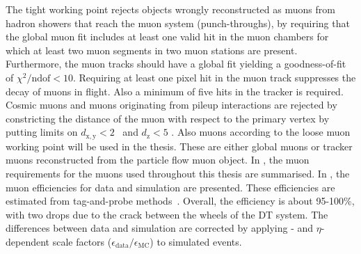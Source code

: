The tight working point rejects objects wrongly reconstructed as muons from hadron showers that reach the muon system (punch-throughs), by requiring that the global muon fit includes at least one valid hit in the muon chambers for which at least two muon segments in two muon stations are present. Furthermore, the muon tracks should have a global fit yielding a goodness-of-fit of $\chi^2 / \mathrm{ndof} < 10$. Requiring at least one pixel hit in the muon track suppresses the decay of muons in flight. Also a minimum of five hits in the tracker is required. Cosmic muons and muons originating from pileup interactions are rejected by constricting the distance of the muon with respect to the primary vertex by putting limits on $d_{\mathrm{x,y}}< 2$ \mm\ and $d_{\mathrm{z}}<5$ \mm. Also muons according to the loose muon working point will be used in the thesis. These are either global muons or tracker muons reconstructed from the particle flow muon object. In , the muon requirements for the muons used throughout this thesis are summarised.  In , the muon efficiencies for data and simulation are presented. These efficiencies are estimated from tag-and-probe methods~\cite{CMS-DP-2017-007}.
Overall, the efficiency is about 95-100\%, with two drops due to the crack between the wheels of the DT system. The differences between data and simulation are corrected by applying \pt- and $\eta$-dependent scale factors ($\epsilon_{\mathrm{data}}/\epsilon_{\mathrm{MC}}$) to simulated events. 

